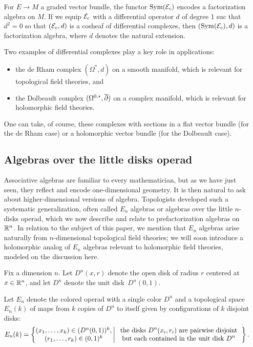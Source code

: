 \documentclass[11pt]{amsart}
\def\owen#1{{\textcolor{violet!65!black}{OG: {#1}}}}
\begin{document}
\begin{thm}[\owen{cite book}]
For $E \to M$ a graded vector bundle, the functor $\operatorname{Sym}(\mathcal E_c)$ encodes a factorization algebra on $M$.
If we equip $\mathcal E_c$ with a differential operator $d$ of degree 1 suc that $d^2 = 0$ so that $(\mathcal E_c, d)$ is a cosheaf of differential complexes,
then $(\operatorname{Sym}(\mathcal E_c), d)$ is a factorization algebra, where $d$ denotes the natural extension.
\end{thm}

Two examples of differential complexes play a key role in applications: 
\begin{itemize}
\item the de Rham complex $(\Omega^*, d)$ on a smooth manifold, which is relevant for topological field theories, and 
\item the Dolbeault complex $(\Omega^{0,*}, {\overline{\partial}})$ on a complex manifold, which is relevant for holomorphic field theories.
\end{itemize}
One can take, of course, these complexes with sections in a flat vector bundle (for the de Rham case) or a holomorphic vector bundle (for the Dolbeault case).

\subsection{Algebras over the little disks operad}

Associative algebras are familiar to every mathematician, but as we have just seen, they reflect and encode one-dimensional geometry.
It is then natural to ask about higher-dimensional versions of algebra.
Topologists developed such a systematic generalization, often called $E_n$ algebras or algebras over the little $n$-disks operad,
which we now describe and relate to prefactorization algebras on~$\mathbb R^n$.
In relation to the subject of this paper, we mention that $E_n$ algebras arise naturally from $n$-dimensional topological field theories;
we will soon introduce a holomorphic analog of $E_n$ algebras relevant to holomorphic field theories,
modeled on the discussion here.

Fix a dimension $n$. 
Let $D^n(x,r)$ denote the open disk of radius $r$ centered at $x \in \mathbb R^n$,
and let $D^n$ denote the unit disk~$D^n(0,1)$.

\begin{dfn}
Let $E_n$ denote the colored operad with a single color $D^n$ and a topological space $E_n(k)$ of maps from $k$ copies of $D^n$ to itself given by configurations of $k$ disjoint disks:
\[
E_n(k) = \left\{ \begin{matrix}(x_1, \ldots, x_k) \in (D^n(0,1))^k,\\ (r_1, \ldots, r_k) \in (0,1)^k\end{matrix} \,\bigg|\, \text{\begin{tabular}{c}the disks $D^n(x_i,r_i)$ are pairwise disjoint\\ but each contained in the unit disk $D^n$\end{tabular}}\right\}.
\]
\end{dfn}
\end{document}
